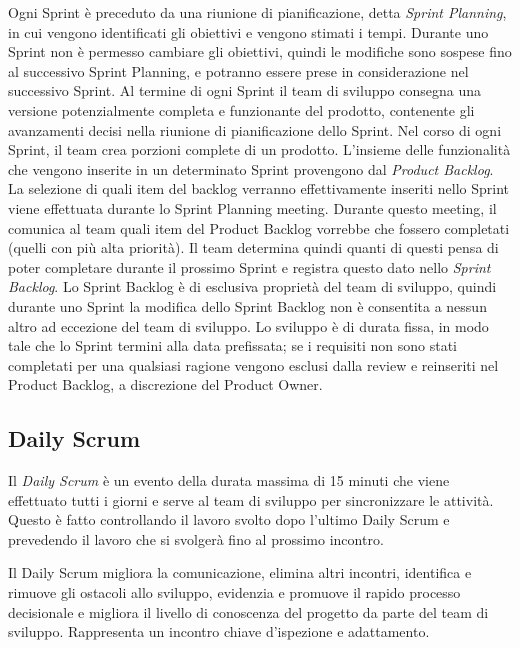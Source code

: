 \documentclass{article}
\begin{document}
Ogni Sprint è preceduto da una riunione di pianificazione, detta \textit{Sprint Planning}, in cui vengono identificati 
gli obiettivi e vengono stimati i tempi.
Durante uno Sprint non è permesso cambiare gli obiettivi, quindi le modifiche sono sospese fino al successivo Sprint Planning, 
e potranno essere prese in considerazione nel successivo Sprint.
Al termine di ogni Sprint il team di sviluppo consegna una versione potenzialmente completa e funzionante del prodotto, 
contenente gli avanzamenti decisi nella riunione di pianificazione dello Sprint.
Nel corso di ogni Sprint, il team crea porzioni complete di un prodotto. 
L'insieme delle funzionalità che vengono inserite in un determinato Sprint provengono dal \textit{Product Backlog}. 
La selezione di quali item del backlog verranno effettivamente inseriti nello Sprint viene effettuata durante lo Sprint Planning meeting. 
Durante questo meeting, il  comunica al team quali item del Product Backlog vorrebbe che fossero completati (quelli con più alta priorità). 
Il team determina quindi quanti di questi pensa di poter completare durante il prossimo Sprint e registra questo dato nello \textit{Sprint Backlog}.
Lo Sprint Backlog è di esclusiva proprietà del team di sviluppo, quindi durante uno Sprint la modifica dello Sprint Backlog non è consentita 
a nessun altro ad eccezione del team di sviluppo. 
Lo sviluppo è di durata fissa, in modo tale che lo Sprint termini alla data prefissata; se i requisiti non sono stati completati 
per una qualsiasi ragione vengono esclusi dalla review e reinseriti nel Product Backlog, a discrezione del Product Owner.

\subsection{Daily Scrum}

Il \textit{Daily Scrum} è un evento della durata massima di 15 minuti che viene effettuato tutti i giorni e 
serve al team di sviluppo per sincronizzare le attività. Questo è fatto controllando il lavoro svolto dopo 
l'ultimo Daily Scrum e prevedendo il lavoro che si svolgerà fino al prossimo incontro.

Il Daily Scrum migliora la comunicazione, elimina altri incontri, identifica e rimuove gli ostacoli allo
sviluppo, evidenzia e promuove il rapido processo decisionale e migliora il livello di conoscenza del
progetto da parte del team di sviluppo. Rappresenta un incontro chiave d'ispezione e adattamento.
\end{document}
